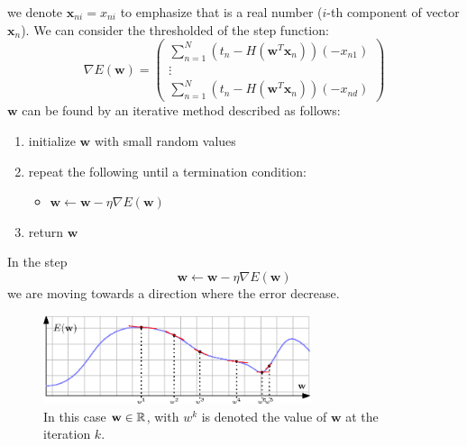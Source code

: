 \documentclass[10pt, letterpaper]{report}
\begin{document}
we denote $\mathbf x_{ni}=x_{ni}$  to emphasize that is a real number ($i$-th component of vector $\mathbf x_n$). We can consider the thresholded of the step function:\begin{equation}
    \nabla E(\mathbf w)=\begin{pmatrix}
        \sum_{n=1}^N(t_n-H(\mathbf w^T\mathbf x_n))(- x_{n1})\\ 
        \vdots \\ 
        \sum_{n=1}^N(t_n-H(\mathbf w^T\mathbf x_n))(- x_{nd})
    \end{pmatrix}
\end{equation}
$\mathbf w$ can be found by an iterative method described as follows:\begin{enumerate}
    \item initialize $\mathbf w$ with small random values 
    \item repeat the following until a termination condition:\begin{itemize}
        \item $\mathbf w\leftarrow \mathbf w-\eta\nabla E(\mathbf w)$
    \end{itemize}
    \item return $\mathbf w$
\end{enumerate}
In the step $$\mathbf w\leftarrow \mathbf w-\eta\nabla E(\mathbf w)$$
we are moving towards a direction where the error decrease.

\begin{figure}[h!]
    \centering
    \includegraphics[width=0.7\textwidth]{images/grad_desc.eps}
    \caption{In this case $\mathbf w\in {\mathbb R}$, with $w^k$ is denoted the value of $\mathbf w$ at the iteration $k$.}
    \label{fig:grad}
\end{figure}
\end{document}
